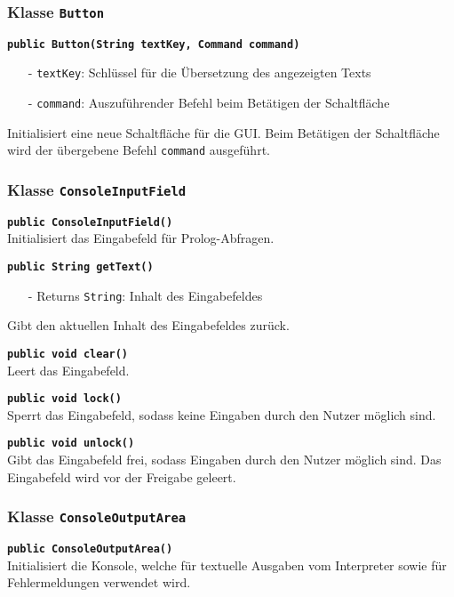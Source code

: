 \documentclass[parskip=full,11pt,twoside]{scrartcl}
\begin{document}
\subsubsection{Klasse \texttt{Button}}

\textbf{\texttt{public Button(String textKey, Command command)}}
\begin{itemize}[noitemsep]
	\item[-] \texttt{textKey}: Schlüssel für die Übersetzung des angezeigten Texts
	\item[-] \texttt{command}: Auszuführender Befehl beim Betätigen der Schaltfläche
\end{itemize}
Initialisiert eine neue Schaltfläche für die GUI. Beim Betätigen der Schaltfläche wird der übergebene Befehl \texttt{command} ausgeführt.

\subsubsection{Klasse \texttt{ConsoleInputField}}

\textbf{\texttt{public ConsoleInputField()}}\\
Initialisiert das Eingabefeld für Prolog-Abfragen.

\textbf{\texttt{public String getText()}}
\begin{itemize}[noitemsep]
	\item[-] Returns \texttt{String}: Inhalt des Eingabefeldes
\end{itemize}
Gibt den aktuellen Inhalt des Eingabefeldes zurück.

\textbf{\texttt{public void clear()}}\\
Leert das Eingabefeld.

\textbf{\texttt{public void lock()}}\\
Sperrt das Eingabefeld, sodass keine Eingaben durch den Nutzer möglich sind.

\textbf{\texttt{public void unlock()}}\\
Gibt das Eingabefeld frei, sodass Eingaben durch den Nutzer möglich sind. Das Eingabefeld wird vor der Freigabe geleert.

\subsubsection{Klasse \texttt{ConsoleOutputArea}}

\textbf{\texttt{public ConsoleOutputArea()}}\\
Initialisiert die Konsole, welche für textuelle Ausgaben vom Interpreter sowie für Fehlermeldungen verwendet wird.
\end{document}
